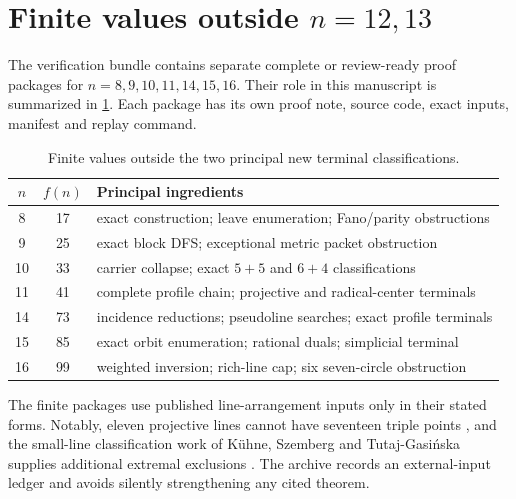 \section{Finite values outside $n=12,13$}

The verification bundle contains separate complete or review-ready proof packages for $n=8,9,10,11,14,15,16$.  Their role in this manuscript is summarized in \cref{tab:finite}.  Each package has its own proof note, source code, exact inputs, manifest and replay command.

\begin{table}[ht]
\centering
\caption{Finite values outside the two principal new terminal classifications.}
\label{tab:finite}
\begin{tabular}{ccl}
\toprule
$n$ & $f(n)$ & Principal ingredients \\
\midrule
8  & 17 & exact construction; leave enumeration; Fano/parity obstructions \\
9  & 25 & exact block DFS; exceptional metric packet obstruction \\
10 & 33 & carrier collapse; exact $5+5$ and $6+4$ classifications \\
11 & 41 & complete profile chain; projective and radical-center terminals \\
14 & 73 & incidence reductions; pseudoline searches; exact profile terminals \\
15 & 85 & exact orbit enumeration; rational duals; simplicial terminal \\
16 & 99 & weighted inversion; rich-line cap; six seven-circle obstruction \\
\bottomrule
\end{tabular}
\end{table}

The finite packages use published line-arrangement inputs only in their stated forms.  Notably, eleven projective lines cannot have seventeen triple points \cite{dumnicki2016}, and the small-line classification work of K\"uhne, Szemberg and Tutaj-Gasi\'nska supplies additional extremal exclusions \cite{kuhne2024}.  The archive records an external-input ledger and avoids silently strengthening any cited theorem.

